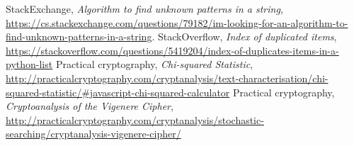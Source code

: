 \documentclass[12pt, letterpaper]{article}
\begin{document}
\newpage
\begin{thebibliography}{10} 
 StackExchange,  \emph{Algorithm to find unknown patterns in a string},
\url{https://cs.stackexchange.com/questions/79182/im-looking-for-an-algorithm-to-find-unknown-patterns-in-a-string}.
 StackOverflow, \emph{Index of duplicated items},
\url{https://stackoverflow.com/questions/5419204/index-of-duplicates-items-in-a-python-list}
 Practical cryptography, \emph{Chi-squared Statistic},
\url{http://practicalcryptography.com/cryptanalysis/text-characterisation/chi-squared-statistic/#javascript-chi-squared-calculator}
 Practical cryptography, \emph{Cryptoanalysis of the Vigenere Cipher},
\url{http://practicalcryptography.com/cryptanalysis/stochastic-searching/cryptanalysis-vigenere-cipher/}
\end{thebibliography}
\end{document}
